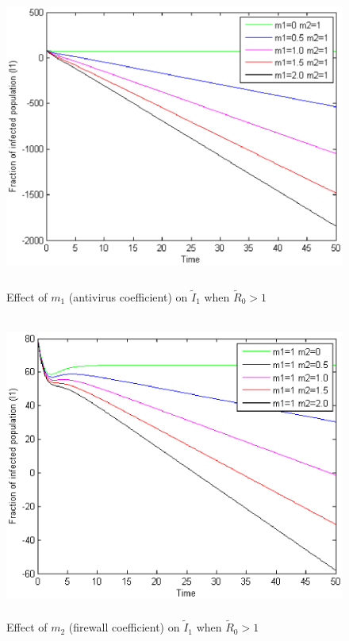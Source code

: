 \begin{figure}[h]
\centerline{\includegraphics[width=15cm,height=10cm]{13-DR14}}
\caption{Effect of $m_1$ (antivirus coefficient) on $ \tilde I_1$ when $\tilde R_0 > 1$}
\label{fig:13-DR14}
\end{figure}
\begin{figure}[h]
\centerline{\includegraphics[width=15cm,height=10cm]{13-DR12}}
\caption{Effect of $m_2$ (firewall coefficient) on $ \tilde I_1$ when $\tilde R_0 > 1$}
\label{fig:13-DR12}
\end{figure}
\clearpage
